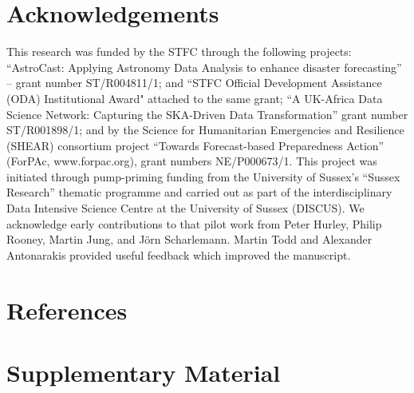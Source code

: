 \documentclass[review]{elsarticle}
\begin{document}
\section*{Acknowledgements}
This research was funded by the STFC through the following projects: ``AstroCast: Applying Astronomy Data Analysis to enhance disaster forecasting'' -- grant number ST/R004811/1; and ``STFC Official Development Assistance (ODA) Institutional Award" attached to the same grant; ``A UK-Africa Data Science Network: Capturing the SKA-Driven Data Transformation'' grant number ST/R001898/1; and by the Science for Humanitarian Emergencies and Resilience (SHEAR) consortium project ``Towards Forecast-based Preparedness Action'' (ForPAc, www.forpac.org), grant numbers NE/P000673/1. This project was initiated through pump-priming funding from the University of Sussex's ``Sussex Research'' thematic programme and carried out as part of the interdisciplinary Data Intensive Science Centre at the University of Sussex (DISCUS). We acknowledge early contributions to that pilot work from Peter Hurley, Philip Rooney, Martin Jung, and J\"{o}rn Scharlemann. Martin Todd and Alexander Antonarakis provided useful feedback which improved the manuscript.




  
\section*{References}



\newpage
  
  \renewcommand\appendixname{Supplementary Material }
\setcounter{figure}{0}    
\setcounter{table}{0}
\setcounter{page}{1}

\appendix

\section*{Supplementary Material}
\end{document}
